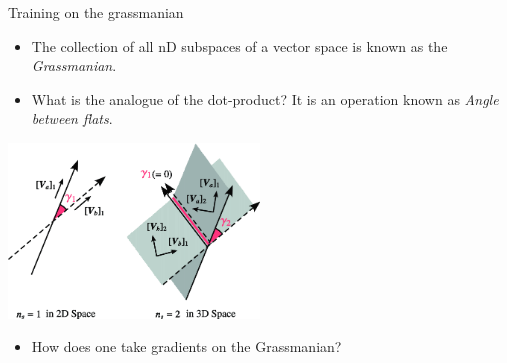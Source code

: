 \documentclass[8pt]{beamer}
\begin{document}
\begin{frame}{Training on the grassmanian}
  \begin{itemize}
    \item The collection of all nD subspaces of a vector space is known as the \emph{Grassmanian}. \pause
    \item What is the analogue of the dot-product? It is an operation known as \emph{Angle between flats}.
  \end{itemize}
  \includegraphics[width=0.5\textwidth]{./angles-between-flats.png}
  \begin{itemize}
    \item How does one take gradients on the Grassmanian?
  \end{itemize}
\end{frame}
\end{document}
